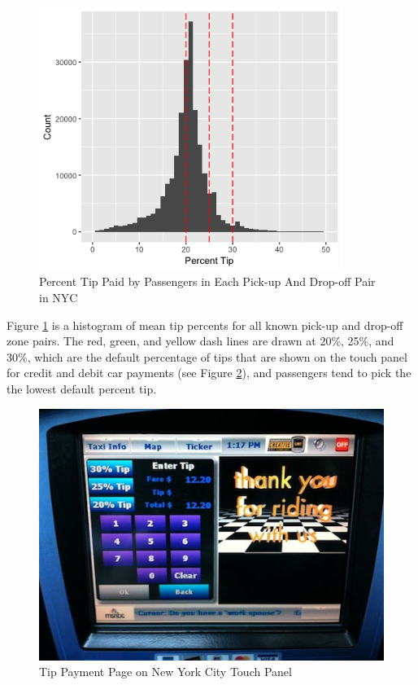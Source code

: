 \documentclass[12pt,twoside]{reedthesis}
\theoremstyle{definition}
\theoremstyle{definition}
\theoremstyle{definition}
\theoremstyle{remark}
\begin{document}
\begin{figure}

{\centering \includegraphics[width=3.89in]{figure/region_vis} 

}

\caption{Percent Tip Paid by Passengers in Each Pick-up And Drop-off Pair in NYC}\label{fig:region-vis}
\end{figure}
Figure \ref{fig:region-vis} is a histogram of mean tip percents for all
known pick-up and drop-off zone pairs. The red, green, and yellow dash
lines are drawn at 20\%, 25\%, and 30\%, which are the default
percentage of tips that are shown on the touch panel for credit and
debit car payments (see Figure \ref{fig:taxi-screen}), and passengers
tend to pick the the lowest default percent tip.
\begin{figure}

{\centering \includegraphics[width=4.8in]{figure/taxi-screen} 

}

\caption{Tip Payment Page on New York City Touch Panel}\label{fig:taxi-screen}
\end{figure}
\end{document}
